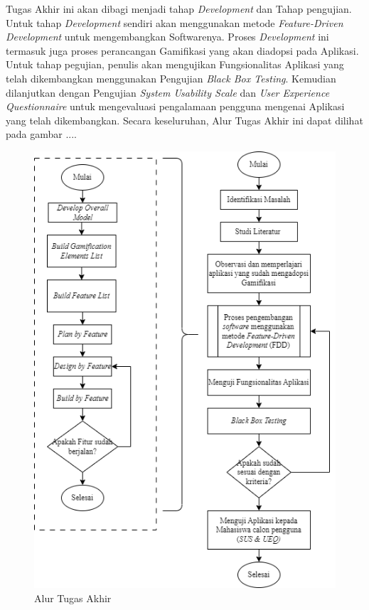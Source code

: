 Tugas Akhir ini akan dibagi menjadi tahap \textit{Development} dan Tahap pengujian.
Untuk tahap \textit{Development} sendiri akan menggunakan metode \textit{Feature-Driven Development} untuk mengembangkan Softwarenya.
Proses \textit{Development} ini termasuk juga proses perancangan Gamifikasi yang akan diadopsi pada Aplikasi.
Untuk tahap pegujian, penulis akan mengujikan Fungsionalitas Aplikasi yang telah dikembangkan menggunakan Pengujian \textit{Black Box Testing}.
Kemudian dilanjutkan dengan Pengujian \textit{System Usability Scale} dan \textit{User Experience Questionnaire} untuk mengevaluasi pengalamaan pengguna mengenai Aplikasi yang telah dikembangkan.
Secara keseluruhan, Alur Tugas Akhir ini dapat dilihat pada gambar ....
\begin{figure}[H]
	\centering
	\includegraphics[width=12cm]{contents/chapter-3/images/Alur-tugas-akhir.png}
	\caption[Caption]{Alur Tugas Akhir}
	\label{Fig:Alur Tugas Akhir}
\end{figure}
